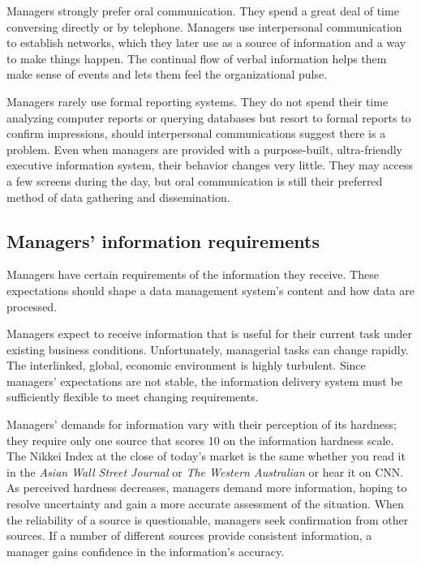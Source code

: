 \documentclass[
]{article}
\begin{document}
Managers strongly prefer oral communication. They spend a great deal of
time conversing directly or by telephone. Managers use interpersonal
communication to establish networks, which they later use as a source of
information and a way to make things happen. The continual flow of
verbal information helps them make sense of events and lets them feel
the organizational pulse.

Managers rarely use formal reporting systems. They do not spend their
time analyzing computer reports or querying databases but resort to
formal reports to confirm impressions, should interpersonal
communications suggest there is a problem. Even when managers are
provided with a purpose-built, ultra-friendly executive information
system, their behavior changes very little. They may access a few
screens during the day, but oral communication is still their preferred
method of data gathering and dissemination.

\hypertarget{managers-information-requirements}{%
\subsection*{Managers' information requirements}\label{managers-information-requirements}}

Managers have certain requirements of the information they receive.
These expectations should shape a data management system's content and
how data are processed.

Managers expect to receive information that is useful for their current
task under existing business conditions. Unfortunately, managerial tasks
can change rapidly. The interlinked, global, economic environment is
highly turbulent. Since managers' expectations are not stable, the
information delivery system must be sufficiently flexible to meet
changing requirements.

Managers' demands for information vary with their perception of its
hardness; they require only one source that scores 10 on the information
hardness scale. The Nikkei Index at the close of today's market is the
same whether you read it in the \emph{Asian Wall Street Journal} or \emph{The
Western Australian} or hear it on CNN. As perceived hardness decreases,
managers demand more information, hoping to resolve uncertainty and gain
a more accurate assessment of the situation. When the reliability of a
source is questionable, managers seek confirmation from other sources.
If a number of different sources provide consistent information, a
manager gains confidence in the information's accuracy.
\end{document}
